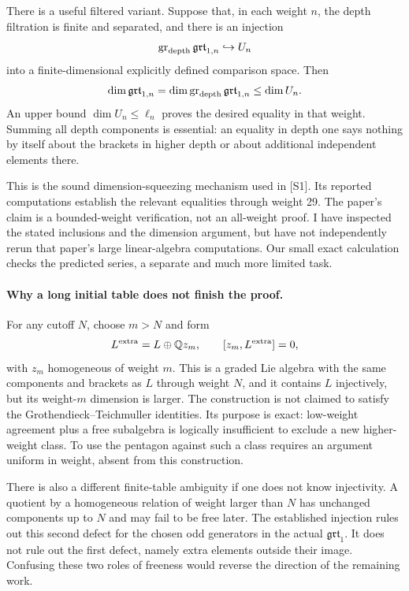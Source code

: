 \documentclass[11pt]{article}
\begin{document}
There is a useful filtered variant. Suppose that, in each weight $n$,
the depth filtration is finite and separated, and there is an injection
\[
 \operatorname{gr}_{\rm depth}\mathfrak{grt}_{1,n}
 \hookrightarrow U_n
\]
into a finite-dimensional explicitly defined comparison space. Then
\[
 \dim\mathfrak{grt}_{1,n}
 =\dim\operatorname{gr}_{\rm depth}\mathfrak{grt}_{1,n}
 \le\dim U_n.
\]
An upper bound $\dim U_n\le\ell_n$ proves the desired equality in that
weight. Summing all depth components is essential: an equality in depth
one says nothing by itself about the brackets in higher depth or about
additional independent elements there.

This is the sound dimension-squeezing mechanism used in [S1]. Its
reported computations establish the relevant equalities through weight
29. The paper's claim is a bounded-weight verification, not an
all-weight proof. I have inspected the stated inclusions and the
dimension argument, but have not independently rerun that paper's large
linear-algebra computations. Our small exact calculation checks the
predicted series, a separate and much more limited task.

\paragraph{Why a long initial table does not finish the proof.}
For any cutoff $N$, choose $m>N$ and form
\[
 L^{\rm extra}=L\oplus\mathbb Q z_m,
 \qquad [z_m,L^{\rm extra}]=0,
\]
with $z_m$ homogeneous of weight $m$. This is a graded Lie algebra with
the same components and brackets as $L$ through weight $N$, and it
contains $L$ injectively, but its weight-$m$ dimension is larger.
The construction is not claimed to satisfy the Grothendieck--Teichmuller
identities. Its purpose is exact: low-weight agreement plus a free
subalgebra is logically insufficient to exclude a new higher-weight
class. To use the pentagon against such a class requires an argument
uniform in weight, absent from this construction.

There is also a different finite-table ambiguity if one does not know
injectivity. A quotient by a homogeneous relation of weight larger than
$N$ has unchanged components up to $N$ and may fail to be free later.
The established injection rules out this second defect for the chosen
odd generators in the actual $\mathfrak{grt}_1$. It does not rule out the
first defect, namely extra elements outside their image. Confusing these
two roles of freeness would reverse the direction of the remaining work.
\end{document}
